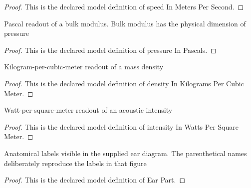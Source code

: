 \begin{proof}
  This is the declared model definition of speed In Meters Per Second.
\end{proof}
\begin{definition}
  \label{def:physics:phyx-mini-0189:phyxminiproblems-problemphyxmini0189-pressureinpascals}
  Pascal readout of a bulk modulus. Bulk modulus has the physical dimension of pressure
\end{definition}
\begin{proof}
  This is the declared model definition of pressure In Pascals.
\end{proof}
\begin{definition}
  \label{def:physics:phyx-mini-0189:phyxminiproblems-problemphyxmini0189-densityinkilogramspercubicmeter}
  Kilogram-per-cubic-meter readout of a mass density
\end{definition}
\begin{proof}
  This is the declared model definition of density In Kilograms Per Cubic Meter.
\end{proof}
\begin{definition}
  \label{def:physics:phyx-mini-0189:phyxminiproblems-problemphyxmini0189-intensityinwattspersquaremeter}
  Watt-per-square-meter readout of an acoustic intensity
\end{definition}
\begin{proof}
  This is the declared model definition of intensity In Watts Per Square Meter.
\end{proof}
\begin{definition}
  \label{def:physics:phyx-mini-0189:phyxminiproblems-problemphyxmini0189-earpart}
  Anatomical labels visible in the supplied ear diagram. The parenthetical names deliberately reproduce the labels in that figure
\end{definition}
\begin{proof}
  This is the declared model definition of Ear Part.
\end{proof}
